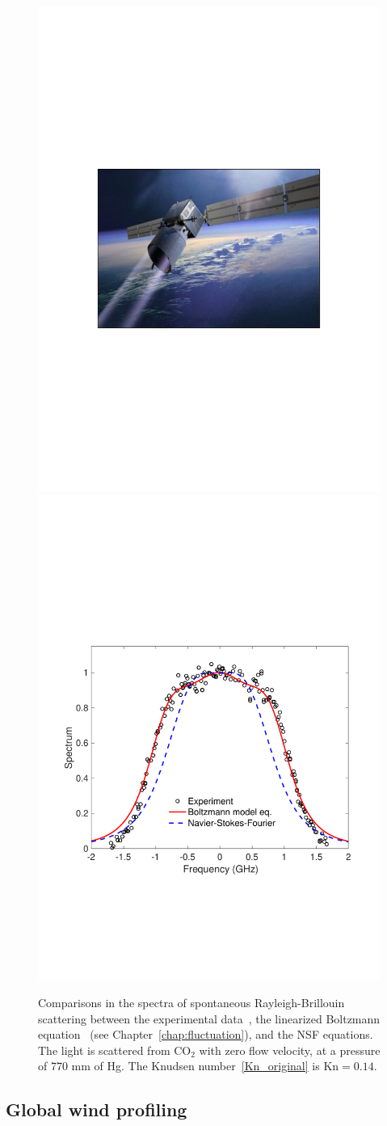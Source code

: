 \begin{figure}[t]
	\centering
	\includegraphics[width=0.45\columnwidth]{Introduction/IMG/ESA_gallery}
	\includegraphics[width=0.5\columnwidth]{Introduction/IMG/PRL2}
	\caption{ 
		Comparisons in the spectra of spontaneous Rayleigh-Brillouin scattering  between the experimental data~\cite{Greytak1966PRL}, the linearized Boltzmann equation~\cite{Wu2020AIA} (see Chapter~\ref{chap:fluctuation}), and the NSF equations. The light is scattered from CO$_2$ with zero flow velocity, at a pressure of 770 mm of Hg. The Knudsen number~\eqref{Kn_original} is $\text{Kn}=0.14$. 
	}
	\label{AdmAeolus}
\end{figure}



\subsection{Global wind profiling}\label{ADM_aeolus}

